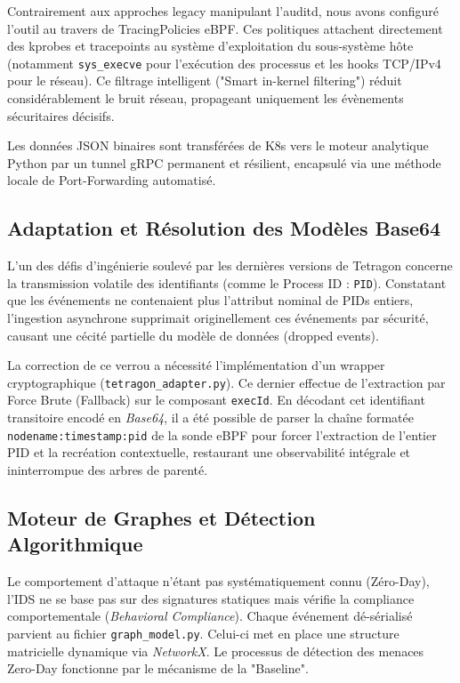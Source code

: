 \documentclass[a4paper,12pt]{article}
\begin{document}
Contrairement aux approches legacy manipulant l'auditd, nous avons configuré l'outil au travers de TracingPolicies eBPF. Ces politiques attachent directement des kprobes et tracepoints au système d'exploitation du sous-système hôte (notamment \texttt{sys\_execve} pour l'exécution des processus et les hooks TCP/IPv4 pour le réseau). Ce filtrage intelligent ("Smart in-kernel filtering") réduit considérablement le bruit réseau, propageant uniquement les évènements sécuritaires décisifs.

Les données JSON binaires sont transférées de K8s vers le moteur analytique Python par un tunnel gRPC permanent et résilient, encapsulé via une méthode locale de Port-Forwarding automatisé.

\subsection{Adaptation et Résolution des Modèles Base64}

L'un des défis d'ingénierie soulevé par les dernières versions de Tetragon concerne la transmission volatile des identifiants (comme le Process ID : \texttt{PID}). Constatant que les événements ne contenaient plus l'attribut nominal de PIDs entiers, l'ingestion asynchrone supprimait originellement ces événements par sécurité, causant une cécité partielle du modèle de données (dropped events).

La correction de ce verrou a nécessité l'implémentation d'un wrapper cryptographique (\texttt{tetragon\_adapter.py}). Ce dernier effectue de l'extraction par Force Brute (Fallback) sur le composant \texttt{execId}. En décodant cet identifiant transitoire encodé en \textit{Base64}, il a été possible de parser la chaîne formatée \texttt{nodename:timestamp:pid} de la sonde eBPF pour forcer l'extraction de l'entier PID et la recréation contextuelle, restaurant une observabilité intégrale et ininterrompue des arbres de parenté. 

\subsection{Moteur de Graphes et Détection Algorithmique}

Le comportement d'attaque n'étant pas systématiquement connu (Zéro-Day), l'IDS ne se base pas sur des signatures statiques mais vérifie la compliance comportementale (\textit{Behavioral Compliance}). Chaque événement dé-sérialisé parvient au fichier \texttt{graph\_model.py}. Celui-ci met en place une structure matricielle dynamique via \textit{NetworkX}. Le processus de détection des menaces Zero-Day fonctionne par le mécanisme de la "Baseline".
\end{document}
